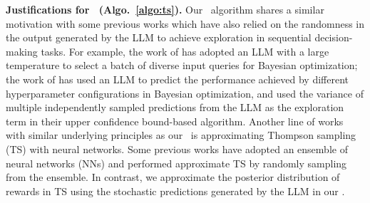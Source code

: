 \textbf{Justifications for \algts~(Algo.~\ref{algo:ts}).}
Our \algts~algorithm shares a similar motivation with some previous works which have also relied on the randomness in the output generated by the LLM to achieve exploration in sequential decision-making tasks.
For example, the work of \citet{yang2023large} has adopted an LLM with a large temperature to select a batch of diverse input queries for Bayesian optimization; the work of \citet{liu2024large} has used an LLM to predict the performance achieved by different hyperparameter configurations in Bayesian optimization, and used the variance of multiple independently sampled predictions from the LLM as the exploration term in their upper confidence bound-based algorithm.
Another line of works with similar underlying principles as our \algts~is approximating Thompson sampling (TS) with neural networks.
Some previous works have adopted an ensemble of neural networks (NNs) \cite{osband2016deep,osband2023epistemic,dwaracherla2024efficient} and performed approximate TS by randomly sampling from the ensemble.
In contrast, we approximate the posterior distribution of rewards in TS using the stochastic predictions generated by the LLM in our \algts.

